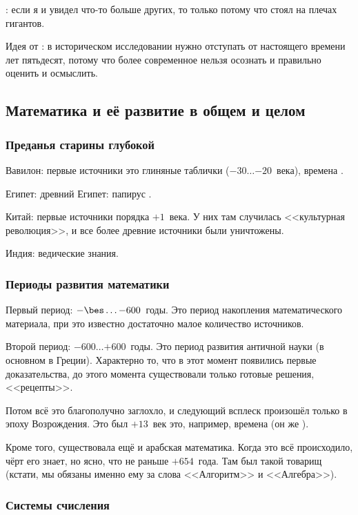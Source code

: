 \documentclass[a4paper,oneside,fleqn,10pt]{article}
\newcommand{\pe}[2]{${#1}\ldots{#2}$}
\begin{document}
: если я и увидел что-то больше других, то только потому что стоял на
плечах гигантов.

Идея от : в историческом исследовании нужно отступать от настоящего
времени лет пятьдесят, потому что более современное нельзя
осознать и правильно оценить и осмыслить.

\subsection{Математика и её развитие в общем и целом}

\subsubsection{Преданья старины глубокой}

Вавилон: первые источники это глиняные таблички (\pe{-30}{-20}~века), времена .

Египет: древний Египет: папирус .

Китай: первые источники порядка $+1$~века. У них там случилась
<<культурная революция>>, и все более древние источники были уничтожены.

Индия: ведические знания.

\subsubsection{Периоды развития математики}

Первый период: \pe{-\bes}{-600}~годы. Это период накопления математического
материала, при это известно достаточно малое количество источников.

Второй период: \pe{-600}{+600}~годы.
Это период развития античной науки (в основном в Греции).
Характерно то, что в этот момент появились первые  доказательства,
до этого момента существовали только готовые решения, <<рецепты>>.

Потом всё это благополучно заглохло,
и следующий всплеск произошёл только в эпоху Возрождения.
Это был $+13$~век это, например, времена  (он же ).

Кроме того, существовала ещё и арабская математика.
Когда это всё происходило, чёрт  его знает,
но ясно, что не раньше $+654$~года.
Там был такой товарищ  (кстати, мы обязаны
именно ему за слова <<Алгоритм>> и <<Алгебра>>).

\subsubsection{Системы счисления}
\end{document}
